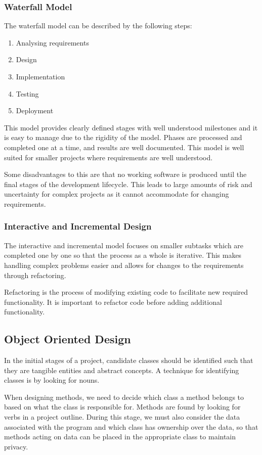 \documentclass{article}
\begin{document}
\subsubsection{Waterfall Model}
The waterfall model can be described by the following steps:
\begin{enumerate}
    \item Analysing requirements
    \item Design
    \item Implementation
    \item Testing
    \item Deployment
\end{enumerate}
This model provides clearly defined stages with well understood milestones and
it is easy to manage due to the rigidity of the model.
Phases are processed and completed one at a time, and results are well documented.
This model is well suited for smaller projects where requirements are well understood.

Some disadvantages to this are that no working software is produced until the final stages of the
development lifecycle. This leads to large amounts of risk and uncertainty for complex projects
as it cannot accommodate for changing requirements.
\subsubsection{Interactive and Incremental Design}
The interactive and incremental model focuses on smaller subtasks which are completed
one by one so that the process as a whole is iterative. This makes handling complex problems
easier and allows for changes to the requirements through refactoring.

Refactoring is the process of modifying existing code to facilitate new required functionality.
It is important to refactor code before adding additional functionality.
\subsection{Object Oriented Design}
In the initial stages of a project, candidate classes should be identified such that they are tangible entities
and abstract concepts. A technique for identifying classes is by looking for nouns.

When designing methods, we need to decide which class a method belongs to based on what the class is
responsible for. Methods are found by looking for verbs in a project outline.
During this stage, we must also consider the data associated with the program and which class
has ownership over the data, so that methods acting on data can be placed in the appropriate class
to maintain privacy.
\end{document}

